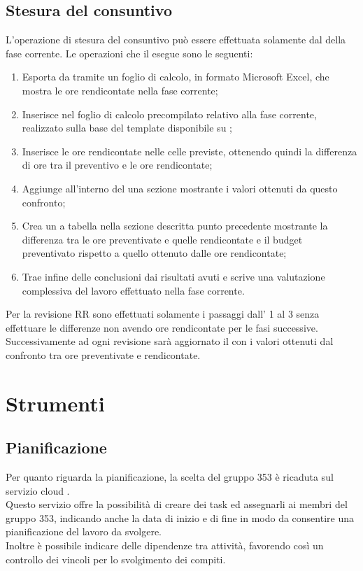 \documentclass[NormeDiProgetto.tex]{subfiles}
\begin{document}
	\subsection{Stesura del consuntivo}
	L’operazione di stesura del consuntivo può essere effettuata solamente dal \respdiprog{} della fase corrente.
	Le operazioni che il \respdiprog{} esegue sono le seguenti:
	\begin{enumerate}
		\item Esporta da  tramite  un foglio di calcolo, in formato Microsoft Excel, che mostra le ore rendicontate nella fase corrente;
		\item Inserisce nel foglio di calcolo precompilato relativo alla fase corrente, realizzato sulla base del template disponibile su ;
		\item Inserisce le ore rendicontate nelle celle previste, ottenendo quindi la differenza di ore tra il preventivo e le ore rendicontate;
		\item Aggiunge all'interno del \pdp{} una sezione mostrante i valori ottenuti da questo confronto;
		\item Crea un a tabella nella sezione descritta punto precedente mostrante la differenza tra le ore preventivate e quelle rendicontate e il budget preventivato rispetto a quello ottenuto dalle ore rendicontate;
		\item Trae infine delle conclusioni dai risultati avuti e scrive una valutazione complessiva	del lavoro effettuato nella fase corrente.
	\end{enumerate}
	Per la revisione RR sono effettuati solamente i passaggi dall' 1 al 3 senza effettuare le differenze non avendo ore rendicontate per le fasi successive. Successivamente ad ogni revisione sarà aggiornato il \pdp{} con i valori ottenuti dal confronto tra ore preventivate e rendicontate. 
	
	\section{Strumenti}	
	\subsection{Pianificazione} Per quanto riguarda la pianificazione, la scelta del gruppo 353 è ricaduta sul servizio cloud .\\
	Questo servizio offre la possibilità di creare dei task ed assegnarli ai membri del gruppo 353, indicando anche la data di inizio e di fine in modo da consentire una pianificazione del lavoro da svolgere.\\
	Inoltre è possibile indicare delle dipendenze tra attività, favorendo così un controllo dei vincoli per lo svolgimento dei compiti.\\
\end{document}

